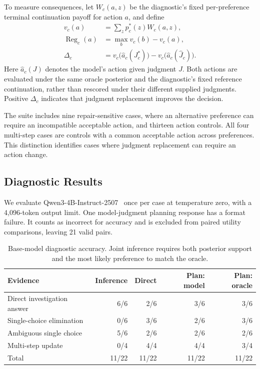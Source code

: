 \documentclass[11pt,a4paper]{article}
\begin{document}
To measure consequences, let $W_c(a,z)$ be the diagnostic's fixed
per-preference terminal continuation payoff for action $a$, and define
\begin{align}
 v_c(a)&=\sum_z p_c^*(z)W_c(a,z),\\
 \operatorname{Reg}_c(a)&=\max_b v_c(b)-v_c(a),\\
 \Delta_c&=v_c\bigl(\widehat a_c(J_c^*)\bigr)
           -v_c\bigl(\widehat a_c(\widehat J_c)\bigr).
 \label{eq:diagnostic-intervention}
\end{align}
Here $\widehat a_c(J)$ denotes the model's action given judgment $J$.
Both actions are evaluated under the same oracle posterior and the
diagnostic's fixed reference continuation, rather than rescored under their different
supplied judgments. Positive $\Delta_c$ indicates that judgment replacement
improves the decision.

The suite includes nine repair-sensitive cases, where an alternative
preference can require an incompatible acceptable action, and thirteen
action controls. All four multi-step cases are controls with a common
acceptable action across preferences. This distinction identifies cases
where judgment replacement can require an action change.

\subsection{Diagnostic Results}
We evaluate Qwen3-4B-Instruct-2507~\cite{qwen2025instruct2507} once per case at temperature
zero, with a 4,096-token output limit. One model-judgment planning response
has a format failure. It counts as incorrect for accuracy and is excluded
from paired utility comparisons, leaving 21 valid pairs.

\begin{table}[tb]
\centering\small
\caption{Base-model diagnostic accuracy. Joint inference requires both
posterior support and the most likely preference to match the oracle.}
\label{tab:diagnosis}
\begin{tabular}{lrrrr}
\toprule
Evidence & Inference & Direct & Plan: model & Plan: oracle\\
\midrule
Direct investigation answer & 6/6 & 2/6 & 3/6 & 3/6\\
Single-choice elimination & 0/6 & 3/6 & 2/6 & 3/6\\
Ambiguous single choice & 5/6 & 2/6 & 2/6 & 2/6\\
Multi-step update & 0/4 & 4/4 & 4/4 & 3/4\\
\midrule
Total & 11/22 & 11/22 & 11/22 & 11/22\\
\bottomrule
\end{tabular}
\end{table}
\end{document}
